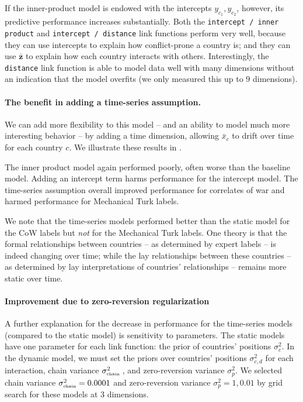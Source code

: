 If the inner-product model is endowed with the intercepts $y_{c_1},
y_{c_2}$, however, its predictive performance increases substantially.
Both the \verb!intercept / inner product! and
\verb!intercept / distance! link functions perform very well, because
they can use intercepts to explain how conflict-prone a country is;
and they can use $\bm \bar z$ to explain how each country interacts
with others.  Interestingly, the \verb!distance! link function is able
to model data well with many dimensions without an indication that the
model overfits (we only measured this up to 9 dimensions).

\paragraph{The benefit in adding a time-series assumption.}

We can add more flexibility to this model -- and an ability to model
much more interesting behavior -- by adding a time dimension, allowing
$\bar x_c$ to drift over time for each country $c$.  We illustrate
these results in .

The inner product model again performed poorly, often worse than the
baseline model.  Adding an intercept term harms performance for the
intercept model.  The time-series assumption overall improved
performance for correlates of war and harmed performance for
Mechanical Turk labels.

We note that the time-series models performed better than the static
model for the CoW labels but \emph{not} for the Mechanical Turk
labels.  One theory is that the formal relationships between countries
-- as determined by expert labels -- is indeed changing over time;
while the lay relationships between these countries -- as determined
by lay interpretations of countries' relationships -- remains more
static over time.

\paragraph{Improvement due to zero-reversion regularization}
A further explanation for the decrease in performance for the
time-series models (compared to the static model) is sensitivity to
parameters.  The static models have one parameter for each link
function: the prior of countries' positions $\sigma_{c}^2$.  In the
dynamic model, we must set the priors over countries' positions
$\sigma_{c,d}^2$ for each interaction, chain variance
$\sigma_{\mbox{\tiny chain }}^2$, and zero-reversion variance
$\sigma_{p}^2$.  We selected chain variance $\sigma_{\mbox{\tiny
    chain}}^2=0.0001$ and zero-reversion variance $\sigma_p^2=1,0.01$
by grid search for these models at $3$ dimensions.

